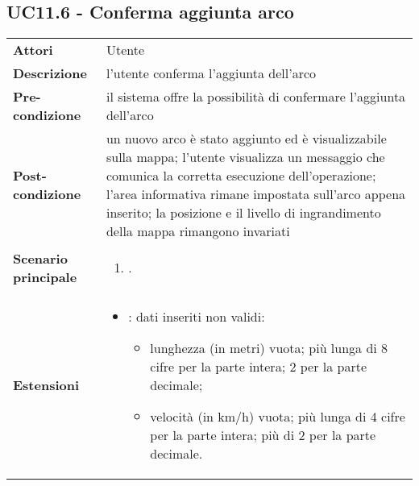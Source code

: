 \subsection{UC11.6 - Conferma aggiunta arco} 
\label{sssec:UC11.6} 
\def\arraystretch{1.5}
\begin{tabularx}{\textwidth}{l|p{}}
	\rowcolor{I} \multicolumn{2}{c}{\color{white}\textbf{UC11.6 - Conferma aggiunta arco}} \\
	\toprule
	\endhead
	\textbf{Attori} & Utente\\
	\textbf{Descrizione} & l'utente conferma l'aggiunta dell'arco\\
	\textbf{Pre-condizione} & il sistema offre la possibilità di confermare l'aggiunta dell'arco\\
	\textbf{Post-condizione} & un nuovo arco è stato aggiunto ed è visualizzabile sulla mappa; l'utente visualizza un messaggio che comunica la corretta esecuzione dell'operazione; l'area informativa rimane impostata sull'arco appena inserito; la posizione e il livello di ingrandimento della mappa rimangono invariati\\
	\textbf{Scenario principale} & \vspace{-1.2em}\begin{enumerate}[leftmargin=*,noitemsep,nosep]
		\item \nameref{sssec:UC11.6}.
	\end{enumerate}\\
	\textbf{Estensioni} & \vspace{-1.2em}\begin{itemize}[leftmargin=*,noitemsep,nosep]
		\item \nameref{sssec:UC11.7}: dati inseriti non validi:
		\begin{itemize}
			\item lunghezza (in metri) vuota;
			più lunga di 8 cifre per la parte intera; 2 per la parte
			decimale;
			\item velocità (in km/h) vuota; più
			lunga di 4 cifre per la parte intera; più di 2 per la parte
			decimale.
		\end{itemize} 
	\end{itemize}\\
	\bottomrule
\end{tabularx}
